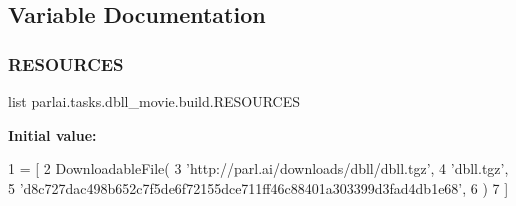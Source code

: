 \subsection{Variable Documentation}
\mbox{\label{namespaceparlai_1_1tasks_1_1dbll__movie_1_1build_acd0aebde6c9b95583970843821abb78e}} 
\subsubsection{\texorpdfstring{R\+E\+S\+O\+U\+R\+C\+ES}{RESOURCES}}
{\footnotesize\ttfamily list parlai.\+tasks.\+dbll\+\_\+movie.\+build.\+R\+E\+S\+O\+U\+R\+C\+ES}

{\bfseries Initial value\+:}
\begin{DoxyCode}
1 =  [
2     DownloadableFile(
3         \textcolor{stringliteral}{'http://parl.ai/downloads/dbll/dbll.tgz'},
4         \textcolor{stringliteral}{'dbll.tgz'},
5         \textcolor{stringliteral}{'d8c727dac498b652c7f5de6f72155dce711ff46c88401a303399d3fad4db1e68'},
6     )
7 ]
\end{DoxyCode}

